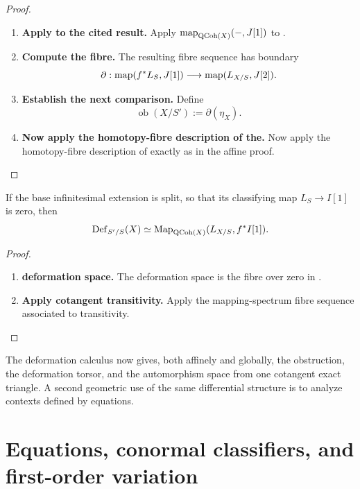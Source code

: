 \begin{proof}
\leavevmode
\begin{enumerate}[label=\textup{(\arabic*)}]
    \item \textbf{Apply to the cited result.}
    Apply \(\operatorname{map}_{\operatorname{QCoh}(X)}(-,J[1])\) to .

    \item \textbf{Compute the fibre.}
    The resulting fibre sequence has boundary
    \[
        \partial:
        \operatorname{map}(f^*L_S,J[1])
        \longrightarrow
        \operatorname{map}(L_{X/S},J[2]).
    \]

    \item \textbf{Establish the next comparison.}
    Define
    \[
        \operatorname{ob}(X/S'):=\partial(\eta_X).
    \]

    \item \textbf{Now apply the homotopy-fibre description of the.}
    Now apply the homotopy-fibre description of 
    exactly as in the affine proof.
\end{enumerate}
\end{proof}

\begin{corollary}
\label{cor:split-first-order-deformations}
If the base infinitesimal extension is split, so that its classifying map
\(L_S\to I[1]\) is zero, then
\[
    \operatorname{Def}_{S'/S}(X)
    \simeq
    \operatorname{Map}_{\operatorname{QCoh}(X)}(L_{X/S},f^*I[1]).
\]
\end{corollary}

\begin{proof}
\leavevmode
\begin{enumerate}[label=\textup{(\arabic*)}]
    \item \textbf{deformation space.}
    The deformation space is the fibre over zero in .

    \item \textbf{Apply cotangent transitivity.}
    Apply the mapping-spectrum fibre sequence associated to transitivity.
\end{enumerate}
\end{proof}
The deformation calculus now gives, both affinely and globally, the obstruction,
the deformation torsor, and the automorphism space from one cotangent exact
triangle. A second geometric use of the same differential structure is to
analyze contexts defined by equations.

\section{Equations, conormal classifiers, and first-order variation}
\label{sec:equations-first-order-variation}

